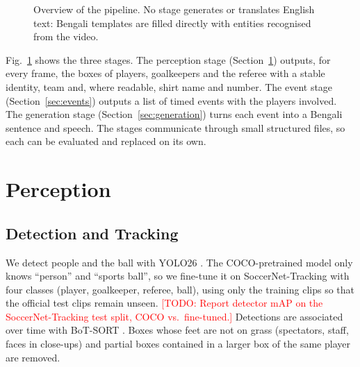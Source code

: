 \documentclass[conference]{IEEEtran}
\newcommand{\todo}[1]{\textcolor{red}{[TODO: #1]}}
\begin{document}
\begin{figure}[t]
\caption{Overview of the pipeline. No stage generates or translates English text: Bengali templates are filled directly with entities recognised from the video.}
\label{fig:pipeline}
\end{figure}

Fig.~\ref{fig:pipeline} shows the three stages. The perception stage (Section~\ref{sec:perception}) outputs, for every frame, the boxes of players, goalkeepers and the referee with a stable identity, team and, where readable, shirt name and number. The event stage (Section~\ref{sec:events}) outputs a list of timed events with the players involved. The generation stage (Section~\ref{sec:generation}) turns each event into a Bengali sentence and speech. The stages communicate through small structured files, so each can be evaluated and replaced on its own.

\section{Perception}
\label{sec:perception}

\subsection{Detection and Tracking}
We detect people and the ball with YOLO26 \cite{jocher2026ultralyticsyolo26}. The COCO-pretrained model only knows ``person'' and ``sports ball'', so we fine-tune it on SoccerNet-Tracking \cite{cioppa2022soccernet} with four classes (player, goalkeeper, referee, ball), using only the training clips so that the official test clips remain unseen. \todo{Report detector mAP on the SoccerNet-Tracking test split, COCO vs.\ fine-tuned.} Detections are associated over time with BoT-SORT \cite{aharon2022botsort}. Boxes whose feet are not on grass (spectators, staff, faces in close-ups) and partial boxes contained in a larger box of the same player are removed.
\end{document}

